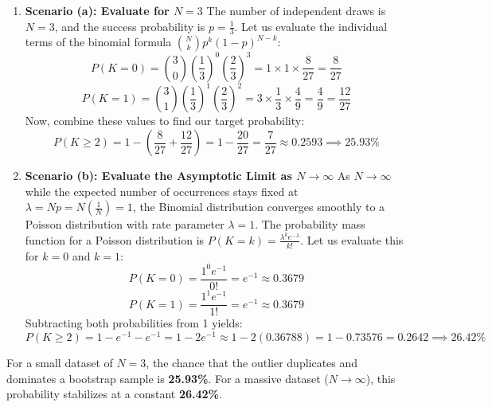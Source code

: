 \documentclass{article}
\begin{document}
\begin{enumerate}
    \item \textbf{Scenario (a): Evaluate for $N=3$}
    The number of independent draws is $N=3$, and the success probability is $p = \frac{1}{3}$. Let us evaluate the individual terms of the binomial formula $\binom{N}{k} p^k (1-p)^{N-k}$:
    \begin{equation}
    P(K = 0) = \binom{3}{0} \left(\frac{1}{3}\right)^0 \left(\frac{2}{3}\right)^3 = 1 \times 1 \times \frac{8}{27} = \frac{8}{27}
    \end{equation}
    \begin{equation}
    P(K = 1) = \binom{3}{1} \left(\frac{1}{3}\right)^1 \left(\frac{2}{3}\right)^2 = 3 \times \frac{1}{3} \times \frac{4}{9} = \frac{4}{9} = \frac{12}{27}
    \end{equation}
    Now, combine these values to find our target probability:
    \begin{equation}
    P(K \ge 2) = 1 - \left( \frac{8}{27} + \frac{12}{27} \right) = 1 - \frac{20}{27} = \frac{7}{27} \approx 0.2593 \implies 25.93\%
    \end{equation}
    
    \item \textbf{Scenario (b): Evaluate the Asymptotic Limit as $N \to \infty$}
    As $N \to \infty$ while the expected number of occurrences stays fixed at $\lambda = Np = N\left(\frac{1}{N}\right) = 1$, the Binomial distribution converges smoothly to a Poisson distribution with rate parameter $\lambda = 1$.
    The probability mass function for a Poisson distribution is $P(K=k) = \frac{\lambda^k e^{-\lambda}}{k!}$. Let us evaluate this for $k=0$ and $k=1$:
    \begin{equation}
    P(K = 0) = \frac{1^0 e^{-1}}{0!} = e^{-1} \approx 0.3679
    \end{equation}
    \begin{equation}
    P(K = 1) = \frac{1^1 e^{-1}}{1!} = e^{-1} \approx 0.3679
    \end{equation}
    Subtracting both probabilities from 1 yields:
    \begin{equation}
    P(K \ge 2) = 1 - e^{-1} - e^{-1} = 1 - 2e^{-1} \approx 1 - 2(0.36788) = 1 - 0.73576 = 0.2642 \implies 26.42\%
    \end{equation}
\end{enumerate}
For a small dataset of $N=3$, the chance that the outlier duplicates and dominates a bootstrap sample is \textbf{25.93\%}. For a massive dataset ($N \to \infty$), this probability stabilizes at a constant \textbf{26.42\%}.
\end{document}

